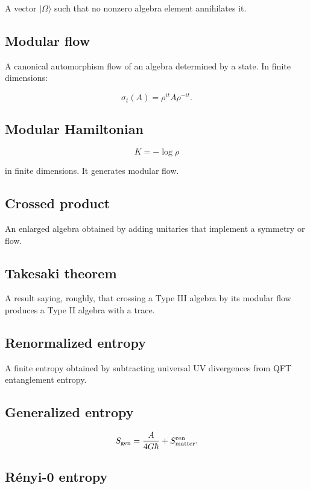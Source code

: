\documentclass[11pt,a4paper]{article}
\begin{document}
A vector $|\Omega\rangle$ such that no nonzero algebra element annihilates it.

\subsection{Modular flow}

A canonical automorphism flow of an algebra determined by a state. In finite dimensions:

\[
\sigma_t(A)=\rho^{it}A\rho^{-it}.
\]

\subsection{Modular Hamiltonian}

\[
K=-\log\rho
\]

in finite dimensions. It generates modular flow.

\subsection{Crossed product}

An enlarged algebra obtained by adding unitaries that implement a symmetry or flow.

\subsection{Takesaki theorem}

A result saying, roughly, that crossing a Type III algebra by its modular flow produces a Type II algebra with a trace.

\subsection{Renormalized entropy}

A finite entropy obtained by subtracting universal UV divergences from QFT entanglement entropy.

\subsection{Generalized entropy}

\[
S_{\rm gen}
=
\frac{A}{4G\hbar}
+
S_{\rm matter}^{\rm ren}.
\]

\subsection{Rényi-0 entropy}
\end{document}

